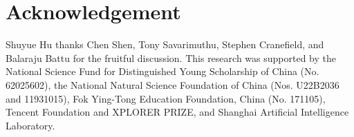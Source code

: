 \documentclass{article}
\begin{document}
\vspace{-0.15cm}
\newpage
\section*{Acknowledgement}
Shuyue Hu thanks Chen Shen, Tony Savarimuthu, Stephen Cranefield, and  Balaraju Battu for the fruitful discussion.
This research was supported by the National Science Fund for Distinguished Young Scholarship of China (No. 62025602), the National Natural Science Foundation of China (Nos. U22B2036 and 11931015), Fok Ying-Tong Education Foundation, China (No. 171105), Tencent Foundation and XPLORER PRIZE, and Shanghai Artificial Intelligence Laboratory.
\vspace{-0.25cm}




{
    
        
        
    
    
    
}
\end{document}
